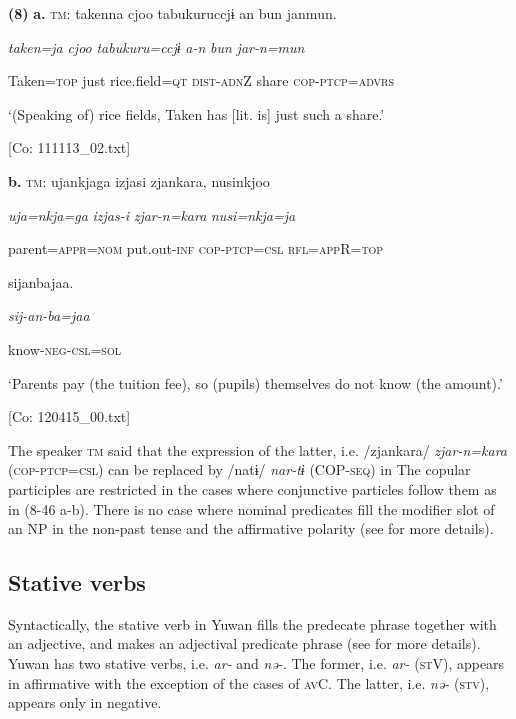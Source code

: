 \textbf{(8)}  \textbf{a.}  \textsc{tm}:  takenna  cjoo  tabukuruccjɨ  an  bun  janmun.

      \textit{taken=ja}  \textit{cjoo}  \textit{tabukuru=ccjɨ}  \textit{a-n}  \textit{bun}  \textit{jar-n=mun}

      Taken=\textsc{top}  just  rice.field=\textsc{qt}  \textsc{dist}-\textsc{adn}Z  share  \textsc{cop}-\textsc{ptcp}=\textsc{advrs}

      ‘(Speaking of) rice fields, Taken has [lit. is] just such a share.’

      [Co: 111113\_02.txt]

  \textbf{b.}  \textsc{tm}:  ujankjaga  izjasi  zjankara,  nusinkjoo

      \textit{uja=nkja=ga}  \textit{izjas-i}  \textit{zjar-n=kara}  \textit{nusi=nkja=ja}

      parent=\textsc{appr}=\textsc{nom}  put.out-\textsc{inf}  \textsc{cop}-\textsc{ptcp}=\textsc{csl}  \textsc{rfl}=\textsc{app}R=\textsc{top}

      sijanbajaa.

      \textit{sij-an-ba=jaa}

      know-\textsc{neg}-\textsc{csl}=\textsc{sol}

      ‘Parents pay (the tuition fee), so (pupils) themselves do not know (the amount).’

      [Co: 120415\_00.txt]

The speaker \textsc{tm} said that the expression of the latter, i.e. /zjankara/ \textit{zjar-n=kara} (\textsc{cop}-\textsc{ptcp}=\textsc{csl}) can be replaced by /natɨ/ \textit{nar-tɨ} (COP-\textsc{seq}) in  The copular participles are restricted in the cases where conjunctive particles follow them as in (8-46 a-b). There is no case where nominal predicates fill the modifier slot of an NP in the non-past tense and the affirmative polarity (see  for more details).

\subsection{Stative verbs}

Syntactically, the stative verb in Yuwan fills the predecate phrase together with an adjective, and makes an adjectival predicate phrase (see  for more details). Yuwan has two stative verbs, i.e. \textit{ar-} and \textit{nə-}. The former, i.e. \textit{ar-} (\textsc{st}V), appears in affirmative with the exception of the cases of \textsc{av}C. The latter, i.e. \textit{nə-} (\textsc{stv}), appears only in negative.

